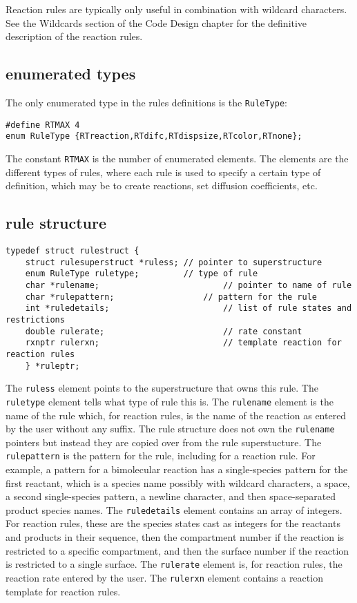 \documentclass {book}
\begin{document}
Reaction rules are typically only useful in combination with wildcard characters.  See the Wildcards section of the Code Design chapter for the definitive description of the reaction rules.

\subsection*{enumerated types}

The only enumerated type in the rules definitions is the \texttt{RuleType}:

\begin{lstlisting}
#define RTMAX 4
enum RuleType {RTreaction,RTdifc,RTdispsize,RTcolor,RTnone};
\end{lstlisting}

The constant \texttt{RTMAX} is the number of enumerated elements.  The elements are the different types of rules, where each rule is used to specify a certain type of definition, which may be to create reactions, set diffusion coefficients, etc.

\subsection*{rule structure}

\begin{lstlisting}
typedef struct rulestruct {
	struct rulesuperstruct *ruless;	// pointer to superstructure
	enum RuleType ruletype;			// type of rule
	char *rulename;							// pointer to name of rule
	char *rulepattern;					// pattern for the rule
	int *ruledetails;						// list of rule states and restrictions
	double rulerate;						// rate constant
	rxnptr rulerxn;							// template reaction for reaction rules
	} *ruleptr;
\end{lstlisting}

The \texttt{ruless} element points to the superstructure that owns this rule.  The \texttt{ruletype} element tells what type of rule this is.  The \texttt{rulename} element is the name of the rule which, for reaction rules, is the name of the reaction as entered by the user without any suffix.  The rule structure does not own the \texttt{rulename} pointers but instead they are copied over from the rule superstucture.  The \texttt{rulepattern} is the pattern for the rule, including for a reaction rule.  For example, a pattern for a bimolecular reaction has a single-species pattern for the first reactant, which is a species name possibly with wildcard characters, a space, a second single-species pattern, a newline character, and then space-separated product species names.  The \texttt{ruledetails} element contains an array of integers.  For reaction rules, these are the species states cast as integers for the reactants and products in their sequence, then the compartment number if the reaction is restricted to a specific compartment, and then the surface number if the reaction is restricted to a single surface.  The \texttt{rulerate} element is, for reaction rules, the reaction rate entered by the user.  The \texttt{rulerxn} element contains a reaction template for reaction rules.
\end{document}
